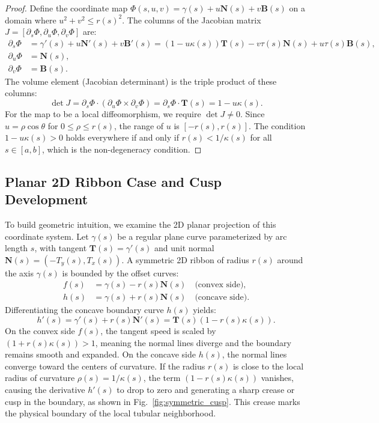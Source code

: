 \documentclass[11pt,twoside]{article}
\begin{document}
\begin{proof}
	Define the coordinate map $\Phi(s, u, v) = \gamma(s) + u \mathbf{N}(s) + v \mathbf{B}(s)$ on a domain where $u^2 + v^2 \leq r(s)^2$. The columns of the Jacobian matrix $J = [\partial_s \Phi, \partial_u \Phi, \partial_v \Phi]$ are:
	\begin{align}
		\partial_s \Phi &= \gamma'(s) + u \mathbf{N}'(s) + v \mathbf{B}'(s) = (1 - u \kappa(s)) \mathbf{T}(s) - v \tau(s) \mathbf{N}(s) + u \tau(s) \mathbf{B}(s), \\
		\partial_u \Phi &= \mathbf{N}(s), \\
		\partial_v \Phi &= \mathbf{B}(s).
	\end{align}
	The volume element (Jacobian determinant) is the triple product of these columns:
	\begin{equation}
		\det J = \partial_s \Phi \cdot (\partial_u \Phi \times \partial_v \Phi) = \partial_s \Phi \cdot \mathbf{T}(s) = 1 - u \kappa(s).
	\end{equation}
	For the map to be a local diffeomorphism, we require $\det J \neq 0$. Since $u = \rho \cos\theta$ for $0 \leq \rho \leq r(s)$, the range of $u$ is $[-r(s), r(s)]$. The condition $1 - u \kappa(s) > 0$ holds everywhere if and only if $r(s) < 1/\kappa(s)$ for all $s \in [a, b]$, which is the non-degeneracy condition.
\end{proof}

\subsection{Planar 2D Ribbon Case and Cusp Development}

To build geometric intuition, we examine the 2D planar projection of this coordinate system. Let $\gamma(s)$ be a regular plane curve parameterized by arc length $s$, with tangent $\mathbf{T}(s) = \gamma'(s)$ and unit normal $\mathbf{N}(s) = (-T_y(s), T_x(s))$. A symmetric 2D ribbon of radius $r(s)$ around the axis $\gamma(s)$ is bounded by the offset curves:
\begin{align}
	f(s) &= \gamma(s) - r(s) \mathbf{N}(s) \quad \text{(convex side)}, \\
	h(s) &= \gamma(s) + r(s) \mathbf{N}(s) \quad \text{(concave side)}.
\end{align}
Differentiating the concave boundary curve $h(s)$ yields:
\begin{equation}
	h'(s) = \gamma'(s) + r(s) \mathbf{N}'(s) = \mathbf{T}(s) (1 - r(s)\kappa(s)).
\end{equation}
On the convex side $f(s)$, the tangent speed is scaled by $(1 + r(s)\kappa(s)) > 1$, meaning the normal lines diverge and the boundary remains smooth and expanded. On the concave side $h(s)$, the normal lines converge toward the centers of curvature. If the radius $r(s)$ is close to the local radius of curvature $\rho(s) = 1/\kappa(s)$, the term $(1 - r(s)\kappa(s))$ vanishes, causing the derivative $h'(s)$ to drop to zero and generating a sharp crease or cusp in the boundary, as shown in Fig.~\ref{fig:symmetric_cusp}. This crease marks the physical boundary of the local tubular neighborhood.
\end{document}
